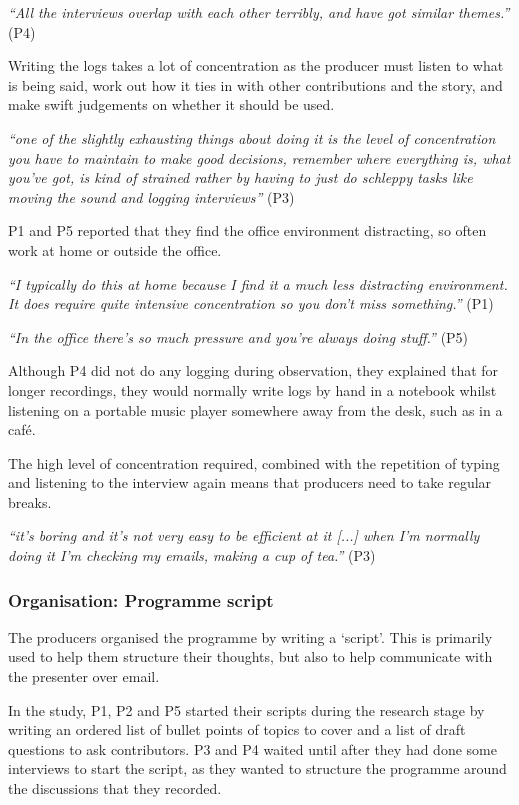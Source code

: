 \textit{``All the interviews overlap with each other terribly, and have got
  similar themes.''} (P4)

Writing the logs takes a lot of concentration as the producer must listen to
what is being said, work out how it ties in with other contributions and the
story, and make swift judgements on whether it should be used.

\textit{``one of the slightly exhausting things about doing it is the level of
  concentration you have to maintain to make good decisions, remember where
  everything is, what you've got, is kind of strained rather by having to just
  do schleppy tasks like moving the sound and logging interviews''} (P3)

P1 and P5 reported that they find the office environment distracting, so often work at home or outside the office.

\textit{``I typically do this at home because I find it a much less distracting
  environment. It does require quite intensive concentration so you don't miss
  something.''} (P1)

\textit{``In the office there's so much pressure and you're always doing stuff.''} (P5)

Although P4 did not do any logging during observation, they explained that for longer recordings, they
would normally write logs by hand in a notebook whilst listening on a
portable music player somewhere away from the desk, such as in a caf\'e.

The high level of concentration required, combined with the repetition of 
typing and listening to the interview again means that producers need to take
regular breaks.

\textit{``it's boring and it's not very easy to be efficient at it [...] when
  I'm normally doing it I'm checking my emails, making a cup of tea.''} (P3)
\subsubsection{Organisation: Programme script}
The producers organised the programme by writing a `script'. This is primarily used to help them structure their
thoughts, but also to help communicate with the presenter over email.

In the study, P1, P2 and P5 started their scripts during the research stage by writing an ordered list of bullet points
of topics to cover and a list of draft questions to ask contributors.  P3 and P4 waited until after they had done some
interviews to start the script, as they wanted to structure the programme around the discussions that they recorded.

